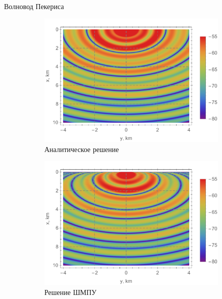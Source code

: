 \documentclass{fefu_presentation}
\begin{document}
     \begin{frame}[fragile]{Волновод Пекериса}
         \begin{figure}[h]
             \centering
             \begin{subfigure}[t]{0.35\textwidth}
                 \centering
                 \includegraphics[width=\textwidth]{pekeris.pdf}
                 \caption{Аналитическое решение}
             \end{subfigure}
             \begin{subfigure}[t]{0.35\textwidth}
                 \centering
                 \includegraphics[width=\textwidth]{pekeris_wampe.pdf}
                 \caption{Решение ШМПУ}
             \end{subfigure}\\
             \begin{subfigure}[t]{0.35\textwidth}

\end{subfigure}
\end{figure}
\end{frame}
\end{document}
